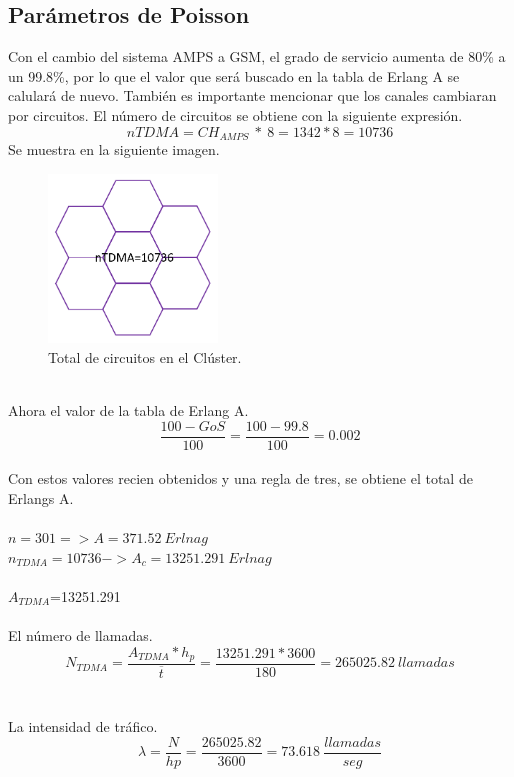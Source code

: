 \documentclass[11pt,letterpaper]{article}
\begin{document}
\subsection{Parámetros de Poisson}
Con el cambio del sistema AMPS a GSM, el grado de servicio aumenta de 80\% a un 99.8\%, por 
lo que el valor que será buscado en la tabla de Erlang A se calulará de nuevo. También es 
importante mencionar que los canales cambiaran por circuitos. El número de circuitos se 
obtiene con la siguiente expresión. 
\begin{equation}
    nTDMA=CH_{AMPS} \ * \ 8=1342*8=10736
\end{equation}
Se muestra en la siguiente imagen.
\begin{figure}[ht]
    \centering
    \includegraphics[width=0.4\textwidth]{imagenes/t32.png}
    \caption{Total de circuitos en el Clúster.}
\end{figure}
\\
Ahora el valor de la tabla de Erlang A.
\begin{equation}
    \frac{100-GoS}{100}=\frac{100-99.8}{100}=0.002
\end{equation}
\\
Con estos valores recien obtenidos y una regla de tres, se obtiene el total de Erlangs A.
\\ \\
$n=301 => A=371.52 \ Erlnag$
\\ 
$n_{TDMA}=10736->A_c=13251.291 \ Erlnag$
\\ \\
$A_{TDMA}$=13251.291
\\ \\
El número de llamadas.
\begin{equation}
    N_{TDMA}=\frac{A_{TDMA}*h_p}{\overline{t}}=\frac{13251.291*3600}{180}=265025.82 \ llamadas
\end{equation}
\\ \\
La intensidad de tráfico.
\begin{equation}
    \lambda=\frac{N}{hp}=\frac{265025.82}{3600}=73.618 \ \frac{llamadas}{seg}
\end{equation}
\end{document}
